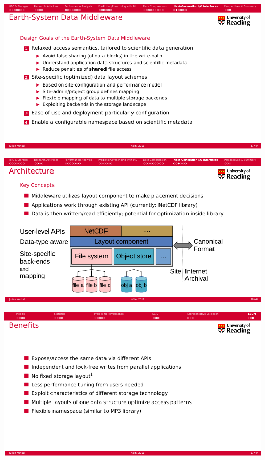 \documentclass[compress,11pt,xcolor=svgnames,aspectratio=169]{beamer}
\begin{document}
\begin{frame}[fragile]{}

\begin{center}
\includegraphics[scale=0.6]{fig/esdm-1}
\end{center}

\end{frame}

\begin{frame}[fragile]{}

\begin{center}
\includegraphics[scale=0.6]{fig/esdm-2}
\end{center}

\end{frame}

\begin{frame}[fragile]{}

\begin{center}
\includegraphics[scale=0.6]{fig/esdm-3}
\end{center}

\end{frame}
\end{document}

